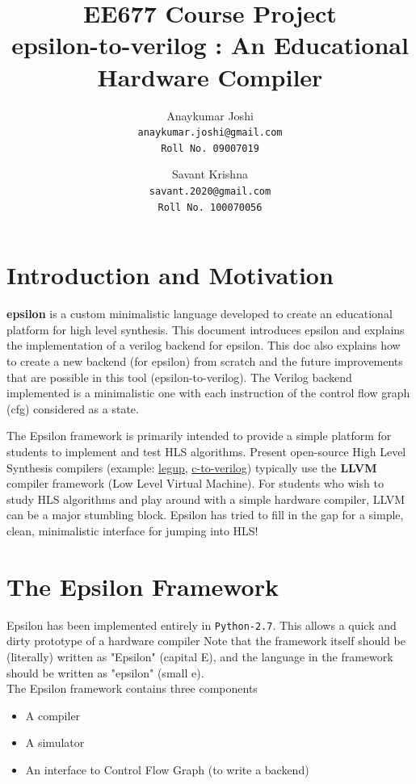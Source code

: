 \documentclass[titlepage]{article}
\title{EE677 Course Project\\[1cm]\textbf{epsilon-to-verilog} : An Educational Hardware Compiler\\[1cm]}
\author{Anaykumar Joshi\\
        \texttt{anaykumar.joshi@gmail.com}\\
        \texttt{Roll No. 09007019}
        \and Savant Krishna\\
        \texttt{savant.2020@gmail.com}\\
        \texttt{Roll No. 100070056}
        }
\begin{document}
\maketitle
\tableofcontents

\section{Introduction and Motivation}
        \textbf{epsilon} is a custom minimalistic language developed to create an educational platform for high level synthesis. This document introduces epsilon and explains the implementation of a verilog backend for epsilon. This doc also explains how to create a new backend (for epsilon) from scratch and the future improvements that are possible in this tool (epsilon-to-verilog). The Verilog backend implemented is a minimalistic one with each instruction of the control flow graph (cfg) considered as a state.


    The Epsilon framework is primarily intended to provide a simple platform for students to implement and test HLS algorithms.
    Present open-source High Level Synthesis compilers (example: \href{http://legup.eecg.utoronto.ca}{legup}, \href{http://c-to-verilog.com}{c-to-verilog}) typically use the \textbf{LLVM} compiler framework (Low Level Virtual Machine). For students who wish to study HLS algorithms and play around with a simple hardware compiler, LLVM can be a major stumbling block. Epsilon has tried to fill in the gap for a simple, clean, minimalistic interface for jumping into HLS!
    
\section{The Epsilon Framework}
    Epsilon has been implemented entirely in \texttt{Python-2.7}. This allows a quick and dirty prototype of a hardware compiler
    Note that the framework itself should be (literally) written as "Epsilon" (capital E), and the language in the framework should be written as "epsilon" (small e).\\
    The Epsilon framework contains three components
    \begin{itemize}
    \item A compiler
    \item A simulator
    \item An interface to Control Flow Graph (to write a backend)
    \end{itemize}
\end{document}
